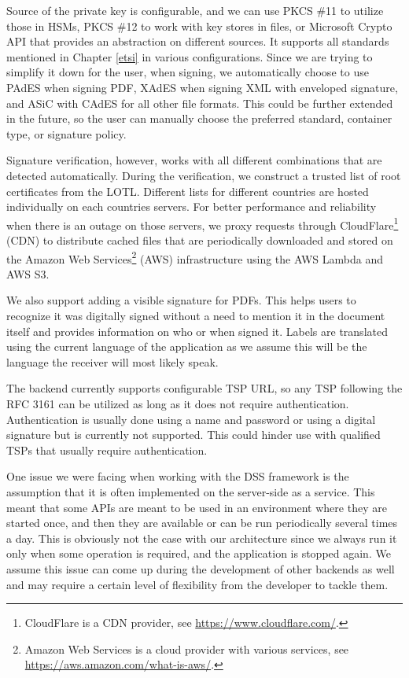 \documentclass[thesismargins, english, thesislinespacing, onelinechapterstyle, upjsfrontpage]{rnthesis}
\begin{document}
Source of the private key is configurable, and we can use PKCS \#11 to utilize those in HSMs, PKCS \#12 to work with key stores in files, or Microsoft Crypto API that provides an abstraction on different sources.
It supports all standards mentioned in Chapter \ref{etsi} in various configurations.
Since we are trying to simplify it down for the user, when signing, we automatically choose to use PAdES when signing PDF, XAdES when signing XML with enveloped signature, and ASiC with CAdES for all other file formats.
This could be further extended in the future, so the user can manually choose the preferred standard, container type, or signature policy.

Signature verification, however, works with all different combinations that are detected automatically.
During the verification, we construct a trusted list of root certificates from the LOTL.
Different lists for different countries are hosted individually on each countries servers.
For better performance and reliability when there is an outage on those servers, we proxy requests through CloudFlare\footnote{CloudFlare is a CDN provider, see \url{https://www.cloudflare.com/}.}  (CDN) to distribute cached files that are periodically downloaded and stored on the Amazon Web Services\footnote{Amazon Web Services is a cloud provider with various services, see \url{https://aws.amazon.com/what-is-aws/}.} (AWS) infrastructure using the AWS Lambda and AWS S3.

We also support adding a visible signature for PDFs.
This helps users to recognize it was digitally signed without a need to mention it in the document itself and provides information on who or when signed it.
Labels are translated using the current language of the application as we assume this will be the language the receiver will most likely speak.

The backend currently supports configurable TSP URL, so any TSP following the RFC 3161 can be utilized as long as it does not require authentication.
Authentication is usually done using a name and password or using a digital signature but is currently not supported.
This could hinder use with qualified TSPs that usually require authentication.

One issue we were facing when working with the DSS framework is the assumption that it is often implemented on the server-side as a service.
This meant that some APIs are meant to be used in an environment where they are started once, and then they are available or can be run periodically several times a day.
This is obviously not the case with our architecture since we always run it only when some operation is required, and the application is stopped again.
We assume this issue can come up during the development of other backends as well and may require a certain level of flexibility from the developer to tackle them.
\end{document}
